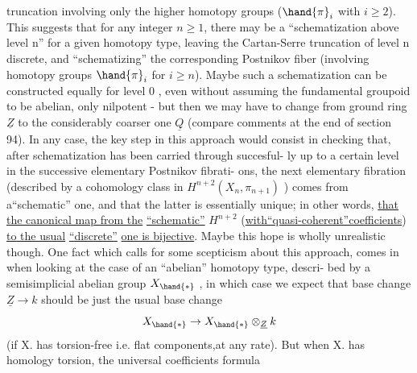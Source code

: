 
truncation involving only the higher homotopy groups ($\hand{\pi}_i$ with $i\geqslant 2$).
This suggests that for any integer $n\geqslant 1$, there may be a ``schematization
above level n'' for a given homotopy type, leaving the Cartan-Serre
truncation of  level n discrete, and ``schematizing'' the
corresponding  Postnikov fiber (involving homotopy groups $\hand{\pi}_i$ for $i\geqslant n$).
Maybe such a schematization can be constructed equally for level 0 ,
even without assuming the fundamental groupoid to be abelian, 
only nilpotent - but then we may have to change from ground ring $\underline{Z}$ to
the considerably coarser one $\underline{Q}$ (compare comments at the end of section
94). In any case, the key step in this approach would consist in 
checking that, after schematization has been carried through succesful-%
ly up to a certain level in the successive elementary Postnikov fibrati-%
ons, the next elementary fibration (described by a cohomology class in
$H^{n+2}(X_n,\pi_{n+1})$ ) comes from a``schematic'' one, and that the latter is
essentially unique; in other words, \uline{that the canonical map from the}
\uline{``schematic''} $H^{n+2}$ (\uline{with``quasi-coherent''coefficients}) \uline{to the usual}
\uline{``discrete''} \uline{one is bijective}. Maybe this hope is wholly unrealistic\hand{\unsure{,}}
though. One fact which calls for some scepticism about this approach,
comes in when looking at the case of an ``abelian'' homotopy type, descri-%
bed by a semisimplicial abelian group $X_{\hand{\ast}}$ , in which case we expect that
base change $\underline{Z}\rightarrow k$ should be just the usual base change
\[ X_{\hand{\ast}} \rightarrow X_{\hand{\ast}}\otimes_{\underline{Z}} k \]
(if X. has torsion-free  i.e. flat components,at any rate).
But when X. has homology torsion, the universal coefficients formula
